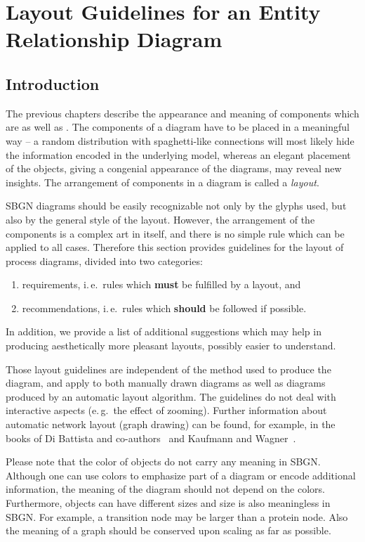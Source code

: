 \color{ForestGreen}
\chapter{Layout Guidelines for an Entity Relationship Diagram}
\label{chp:layout}

\section{Introduction}

The previous chapters describe the appearance and meaning of \SBGNERLone components which are  as well as . The components of a \ER diagram have to be placed in a meaningful way -- a random distribution with spaghetti-like connections will most likely hide the information encoded in the underlying model, whereas an elegant placement of the objects, giving a congenial appearance of the diagrams, may reveal new insights. The arrangement of components in a diagram is called a \emph{layout}.

SBGN \ER diagrams should be easily recognizable not only by the glyphs used, but also by the general style of the layout. However, the arrangement of the components is a complex art in itself, and there is no simple rule which can be applied to all cases. Therefore this section provides guidelines for the layout of process diagrams, divided into two categories:
\begin{enumerate}
  \item requirements, i.\,e.~rules which \textbf{must} be fulfilled by a layout, and
  \item recommendations, i.\,e.~rules which \textbf{should} be followed if possible.
\end{enumerate}
In addition, we provide a list of additional suggestions which may help in producing aesthetically more pleasant layouts, possibly easier to understand.

Those layout guidelines are independent of the method used to produce the diagram, and apply to both manually drawn diagrams as well as diagrams produced by an automatic layout algorithm. The guidelines do not deal with interactive aspects (e.\,g.~the effect of zooming). Further information about automatic network layout (graph drawing) can be found, for example, in the books of Di Battista and co-authors~\cite{DiBattista:1998} and Kaufmann and Wagner~\cite{Kaufmann:2001}.

Please note that the color of objects do not carry any meaning in SBGN. Although one can use colors to emphasize part of a diagram or encode additional information, the meaning of the diagram should not depend on the colors. Furthermore, objects can have different sizes and size is also meaningless in SBGN. For example, a transition node may be larger than a protein node. Also the meaning of a graph should be conserved upon scaling as far as possible.

